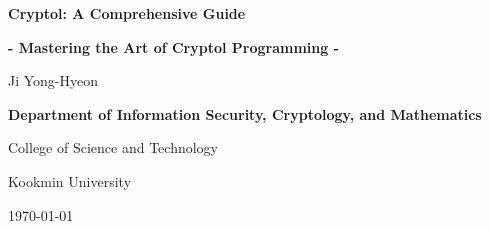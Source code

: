 \documentclass[12pt,openany]{book}
\begin{document}
	
	\begin{titlepage}
		\begin{center}
			{\Huge\textsf{\textbf{Cryptol: A Comprehensive Guide}}\par}
			{\Large\textsf{\textbf{- Mastering the Art of Cryptol Programming -}}\par}
			\vspace{0.5in}
			{\Large {Ji Yong-Hyeon}\par}
			\vspace{1in}
			\vspace{1in}
			{\large\bf \textsf{Department of Information Security, Cryptology, and Mathematics}\par}
			{\textsf{College of Science and Technology}\par}
			{\textsf{Kookmin University}\par}
			\vspace{.25in}
			{\large \textsf{\today}\par}
		\end{center}
	\end{titlepage}
	
	\frontmatter
	
%	
	
	\newpage
	\tableofcontents
	
	\newpage
	\mainmatter
	
%	
%	
	
	\appendix
%	
%	
%	
	
	\backmatter
	
	
\end{document}
